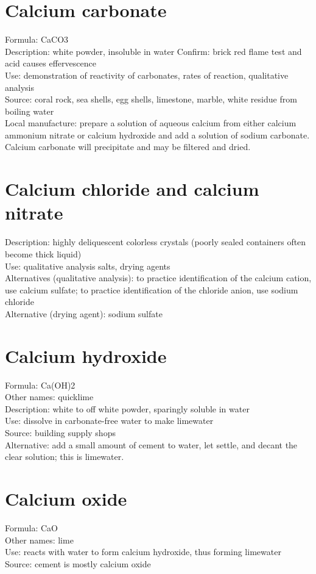 \section{Calcium carbonate}
Formula: CaCO3\\
Description: white powder, 
insoluble in water
Confirm: brick red flame test and acid causes effervescence\\
Use: demonstration of reactivity of carbonates, 
rates of reaction, 
qualitative analysis\\
Source: coral rock, 
sea shells, 
egg shells, 
limestone, 
marble, 
white residue from boiling water\\
Local manufacture: prepare a solution of aqueous calcium 
from either calcium ammonium nitrate or calcium hydroxide 
and add a solution of sodium carbonate.\\ 
Calcium carbonate will precipitate and may be filtered and dried.

\section{Calcium chloride and calcium nitrate}
Description: highly deliquescent colorless crystals 
(poorly sealed containers often become thick liquid)\\
Use: qualitative analysis salts, 
drying agents\\
Alternatives (qualitative analysis): 
to practice identification of the calcium cation, 
use calcium sulfate; 
to practice identification of the chloride anion, 
use sodium chloride\\
Alternative (drying agent): sodium sulfate

\section{Calcium hydroxide}
Formula: Ca(OH)2\\
Other names: quicklime\\
Description: white to off white powder, 
sparingly soluble in water\\
Use: dissolve in carbonate-free water to make limewater\\
Source: building supply shops\\
Alternative: add a small amount of cement to water, 
let settle, 
and decant the clear solution; 
this is limewater.

\section{Calcium oxide}
Formula: CaO\\
Other names: lime\\
Use: reacts with water to form calcium hydroxide, 
thus forming limewater\\
Source: cement is mostly calcium oxide


